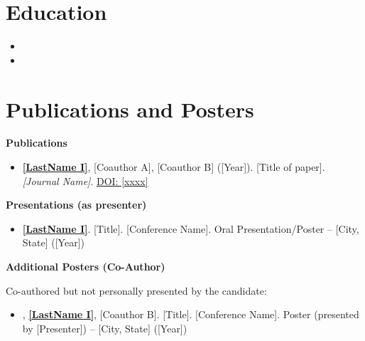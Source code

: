 \documentclass[11pt,letterpaper,sans]{moderncv}
\begin{document}
\section{Education}
\vspace{1pt}
\begin{itemize}

\item{}

\vspace{3pt}

\item{}

\end{itemize}


\section{Publications and Posters}
\vspace{1pt}
\textbf{Publications}
\vspace{1pt}
\begin{itemize}
\item \textbf{\underline{[LastName I]}}, [Coauthor A], [Coauthor B] ([Year]). [Title of paper]. \textit{[Journal Name]}. \href{[https://doi.org/xxxx]}{DOI: [xxxx]}
\end{itemize}

\vspace{3pt}
\textbf{Presentations (as presenter)}
\vspace{1pt}
\begin{itemize}
\item \textbf{\underline{[LastName I]}}. [Title]. [Conference Name]. Oral Presentation/Poster -- [City, State] ([Year])
\end{itemize}

\vspace{3pt}
\textbf{Additional Posters (Co-Author)}

\small{Co-authored but not personally presented by the candidate:}
\begin{itemize}
\item [Coauthor A], \textbf{\underline{[LastName I]}}, [Coauthor B]. [Title]. [Conference Name]. Poster (presented by [Presenter]) -- [City, State] ([Year])
\end{itemize}
\end{document}
